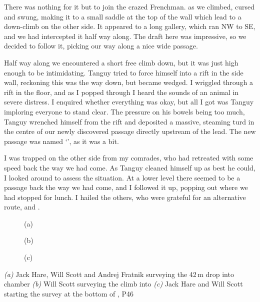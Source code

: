 There was nothing for it but to join the crazed Frenchman.  as we climbed, cursed and swung, making it to a small saddle at the top of the wall which lead to a down-climb on the other side. It appeared to a long gallery, which ran NW to SE, and we had intercepted it half way along. The draft here was impressive, so we decided to follow it, picking our way along a nice wide passage.
 
Half way along we encountered a short free climb down, but it was just high enough to be intimidating. Tanguy tried to force himself into a rift in the side wall, reckoning this was the way down, but became wedged. I wriggled through a rift in the floor, and as I popped through I heard the sounds of an animal in severe distress. I enquired whether everything was okay, but all I got was Tanguy imploring everyone to stand clear. The pressure on his bowels being too much, Tanguy wrenched himself from the rift and deposited a massive, steaming turd in the centre of our newly discovered passage directly upstream of the lead. The new passage was named `', as it was a bit.
 
I was trapped on the other side from my comrades, who had retreated with some speed back the way we had come. As Tanguy cleaned himself up as best he could, I looked around to assess the situation. At a lower level there seemed to be a passage back the way we had come, and I followed it up, popping out where we had stopped for lunch. I hailed the others, who were grateful for an alternative route, and .

\begin{pagefigure}
    \centering
    \begin{subfigure}[t]{0.393\textwidth}
        \centering
        \caption{(a)} \label{Hall of the Mountain King}
    \end{subfigure}
    \hfill
    \begin{subfigure}[t]{0.59\textwidth}
        \centering
        \caption{(b)} \label{Colony}
    \end{subfigure}

    \vspace{0.3cm}
    \begin{subfigure}[t]{\textwidth}
    \centering
        \caption{(c)} \label{Bottom of Blue Danube}
    \end{subfigure}
    
    \caption{
    \textit{(a)} Jack Hare, Will Scott and Andrej Fratnik surveying the 42\,m drop into \protect{} chamber
    \textit{(b)} Will Scott surveying the climb into \protect{}
    \textit{(c)} Jack Hare and Will Scott starting the survey at the bottom of \protect{}, P46 }

\end{pagefigure}


